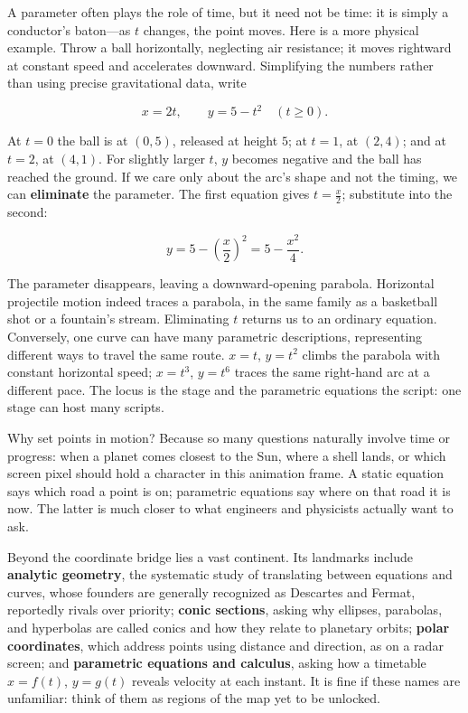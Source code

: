 A parameter often plays the role of time, but it need not be time: it is simply a conductor's baton---as $t$ changes, the point moves. Here is a more physical example. Throw a ball horizontally, neglecting air resistance; it moves rightward at constant speed and accelerates downward. Simplifying the numbers rather than using precise gravitational data, write

\[
x=2t,\qquad y=5-t^{2}\quad(t\ge 0).
\]

At $t=0$ the ball is at $(0,5)$, released at height $5$; at $t=1$, at $(2,4)$; and at $t=2$, at $(4,1)$. For slightly larger $t$, $y$ becomes negative and the ball has reached the ground. If we care only about the arc's shape and not the timing, we can \textbf{eliminate} the parameter. The first equation gives $t=\frac{x}{2}$; substitute into the second:

\[
y=5-\left(\frac{x}{2}\right)^{2}=5-\frac{x^{2}}{4}.
\]

The parameter disappears, leaving a downward-opening parabola. Horizontal projectile motion indeed traces a parabola, in the same family as a basketball shot or a fountain's stream. Eliminating $t$ returns us to an ordinary equation. Conversely, one curve can have many parametric descriptions, representing different ways to travel the same route. $x=t$, $y=t^{2}$ climbs the parabola with constant horizontal speed; $x=t^{3}$, $y=t^{6}$ traces the same right-hand arc at a different pace. The locus is the stage and the parametric equations the script: one stage can host many scripts.

Why set points in motion? Because so many questions naturally involve time or progress: when a planet comes closest to the Sun, where a shell lands, or which screen pixel should hold a character in this animation frame. A static equation says which road a point is on; parametric equations say where on that road it is now. The latter is much closer to what engineers and physicists actually want to ask.

\begin{pandeng}
Beyond the coordinate bridge lies a vast continent. Its landmarks include \textbf{analytic geometry}, the systematic study of translating between equations and curves, whose founders are generally recognized as Descartes and Fermat, reportedly rivals over priority; \textbf{conic sections}, asking why ellipses, parabolas, and hyperbolas are called conics and how they relate to planetary orbits; \textbf{polar coordinates}, which address points using distance and direction, as on a radar screen; and \textbf{parametric equations and calculus}, asking how a timetable $x=f(t)$, $y=g(t)$ reveals velocity at each instant. It is fine if these names are unfamiliar: think of them as regions of the map yet to be unlocked.
\end{pandeng}

